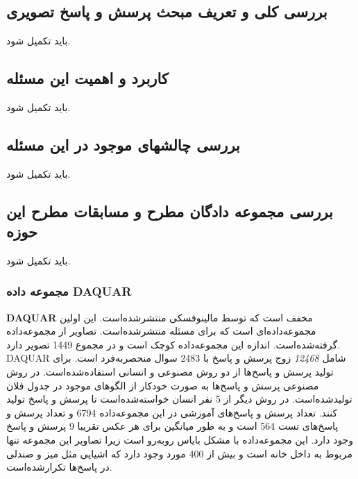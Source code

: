 

\chapter{}
\section{بررسی کلی و تعریف مبحث پرسش و پاسخ تصویری}
باید تکمیل شود.
\section{کاربرد و اهمیت این مسئله}
باید تکمیل شود.
\section{بررسی چالشهای موجود در این مسئله}
باید تکمیل شود.
\section{بررسی مجموعه دادگان مطرح و مسابقات مطرح این حوزه}
باید تکمیل شود.
\subsection{مجموعه داده DAQUAR}
{
	\textbf{DAQUAR}
	 مخفف
است که توسط مالینوفسکی منتشر‌شده‌است. این اولین مجموعه‌داده‌ای است که برای مسئله 
 منتشر‌شده‌است. تصاویر از مجموعه‌داده
   گرفته‌شده‌است.  اندازه این مجموعه‌داده کوچک است و در مجموع 1449 تصویر دارد. 
 DAQUAR
 شامل \textit{12468} زوج پرسش و پاسخ با 2483 سوال منحصربه‌فرد است. برای تولید پرسش و پاسخ‌ها از دو روش مصنوعی و انسانی استفاده‌شده‌است. در روش مصنوعی پرسش و پاسخ‌ها به صورت خودکار از الگوهای موجود در جدول فلان تولید‌شده‌است. در روش دیگر از 5 نفر انسان خواسته‌شده‌است تا پرسش و پاسخ تولید کنند. تعداد پرسش و پاسخ‌های آموزشی در این مجموعه‌داده 6794 و تعداد پرسش و پاسخ‌های تست 564 است و به طور میانگین برای هر عکس تقریبا 9 پرسش و پاسخ وجود دارد. این مجموعه‌داده با مشکل بایاس روبه‌رو است زیرا تصاویر این مجموعه تنها مربوط به داخل خانه است و بیش از 400 مورد وجود دارد که اشیایی مثل میز و صندلی در پاسخ‌ها تکرارشده‌است.
}
